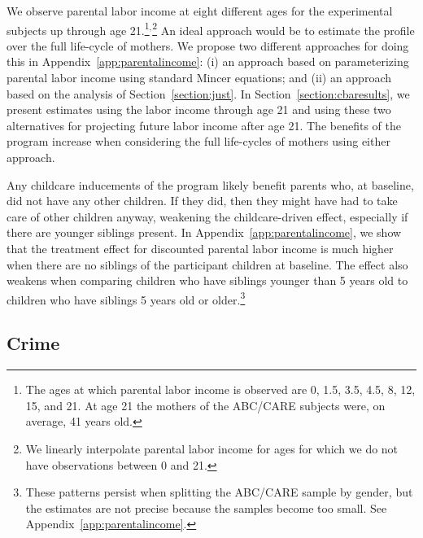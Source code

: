 We observe parental labor income at eight different ages for the experimental subjects up through age 21.\footnote{The ages at which parental labor income is observed are 0, 1.5, 3.5, 4.5, 8, 12, 15, and 21. At age 21 the mothers of the ABC/CARE subjects were, on average, 41 years old.}$^,$\footnote{We linearly interpolate parental labor income for ages for which we do not have observations between 0 and 21.} An ideal approach would be to estimate the profile over the full life-cycle of mothers. We propose two different approaches for doing this in Appendix~\ref{app:parentalincome}: (i) an approach based on parameterizing parental labor income using standard Mincer equations; and (ii) an approach based on the analysis of Section~\ref{section:just}. In Section~\ref{section:cbaresults}, we present estimates using the labor income through age 21 and using these two alternatives for projecting future labor income after age 21. The benefits of the program increase when considering the full life-cycles of mothers using either approach.

Any childcare inducements of the program likely benefit parents who, at baseline, did not have any other children. If they did, then they might have had to take care of other children anyway, weakening the childcare-driven effect, especially if there are younger siblings present. In Appendix~\ref{app:parentalincome}, we show that the treatment effect for discounted parental labor income is much higher when there are no siblings of the participant children at baseline. The effect also weakens when comparing children who have siblings younger than 5 years old to children who have siblings 5 years old or older.\footnote{These patterns persist when splitting the ABC/CARE sample by gender, but the estimates are not precise because the samples become too small. See Appendix~\ref{app:parentalincome}.}

\subsection{Crime}\label{sec:crime}

